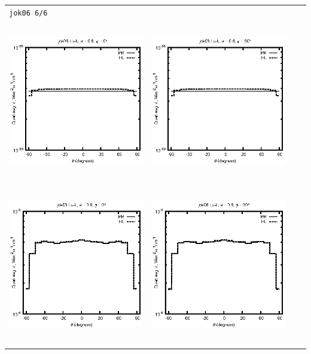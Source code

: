\documentclass[10pt,a4paper]{article}
\begin{document}
\begin{adjustwidth}{-1.2in}{-1.2in}
\begin{tabular}{c c c c}
\multicolumn{4}{l}{\texttt{jok06 6/6}} \\
\includegraphics[height=7cm]{../eps/jok06_Lu_b_fwd.eps} &
\includegraphics[height=7cm]{../eps/jok06_Lu_b_cross.eps} \\
\includegraphics[height=7cm]{../eps/jok06_Lu_it_fwd.eps} &
\includegraphics[height=7cm]{../eps/jok06_Lu_it_cross.eps} \\

\end{tabular}
\end{adjustwidth}
\end{document}

